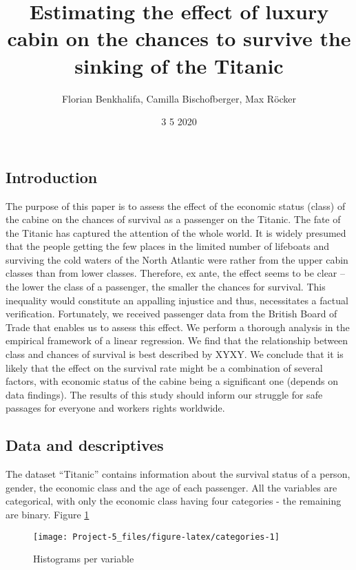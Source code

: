 \documentclass[
]{article}
\title{Estimating the effect of luxury cabin on the chances to survive the
sinking of the Titanic}
\author{Florian Benkhalifa, Camilla Bischofberger, Max Röcker}
\date{3 5 2020}
\begin{document}
\maketitle

\hypertarget{introduction}{%
\subsection{Introduction}\label{introduction}}

The purpose of this paper is to assess the effect of the economic status
(class) of the cabine on the chances of survival as a passenger on the
Titanic. The fate of the Titanic has captured the attention of the whole
world. It is widely presumed that the people getting the few places in
the limited number of lifeboats and surviving the cold waters of the
North Atlantic were rather from the upper cabin classes than from lower
classes. Therefore, ex ante, the effect seems to be clear -- the lower
the class of a passenger, the smaller the chances for survival. This
inequality would constitute an appalling injustice and thus,
necessitates a factual verification. Fortunately, we received passenger
data from the British Board of Trade that enables us to assess this
effect. We perform a thorough analysis in the empirical framework of a
linear regression. We find that the relationship between class and
chances of survival is best described by XYXY. We conclude that it is
likely that the effect on the survival rate might be a combination of
several factors, with economic status of the cabine being a significant
one (depends on data findings). The results of this study should inform
our struggle for safe passages for everyone and workers rights
worldwide.

\hypertarget{data-and-descriptives}{%
\subsection{Data and descriptives}\label{data-and-descriptives}}

The dataset ``Titanic'' contains information about the survival status
of a person, gender, the economic class and the age of each passenger.
All the variables are categorical, with only the economic class having
four categories - the remaining are binary. Figure \ref{fig:categories}

\begin{figure}[h]

{\centering \texttt{[image: Project-5\_files/figure-latex/categories-1]} 

}

\caption{Histograms per variable}\label{fig:categories}
\end{figure}
\end{document}
